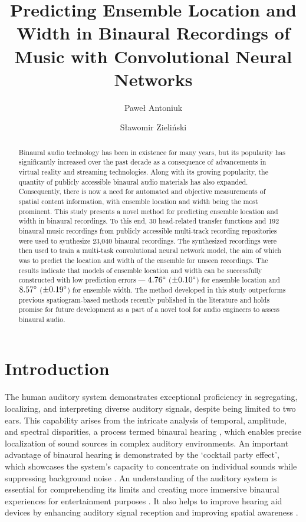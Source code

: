 \documentclass{article}
\title{Predicting Ensemble Location and Width in Binaural Recordings of Music with Convolutional Neural Networks}
\author[1,*]{Paweł Antoniuk}
\author[1]{Sławomir Zieliński}
\affil[1]{Faculty of Computer Science, Białystok University of Technology}
\affil[*]{Corresponding author: pawel.antoniuk@sd.pb.edu.pl}
\date{}
\begin{document}
\maketitle


\begin{abstract}
  Binaural audio technology has been in existence for many years, but its popularity has significantly increased over the past decade as a consequence of advancements in virtual reality and streaming technologies. Along with its growing popularity, the quantity of publicly accessible binaural audio materials has also expanded. Consequently, there is now a need for automated and objective measurements of spatial content information, with ensemble location and width being the most prominent. This study presents a novel method for predicting ensemble location and width in binaural recordings. To this end, 30 head-related transfer functions and 192 binaural music recordings from publicly accessible multi-track recording repositories were used to synthesize 23,040 binaural recordings. The synthesized recordings were then used to train a multi-task convolutional neural network model, the aim of which was to predict the location and width of the ensemble for unseen recordings. The results indicate that models of ensemble location and width can be successfully constructed with low prediction errors --- $4.76\degree$ ($\pm0.10\degree$) for ensemble location and $8.57\degree$ ($\pm0.19\degree$) for ensemble width. The method developed in this study outperforms previous spatiogram-based methods recently published in the literature and holds promise for future development as a part of a novel tool for audio engineers to assess binaural audio.
\end{abstract}

\section{Introduction}

The human auditory system demonstrates exceptional proficiency in segregating, localizing, and interpreting diverse auditory signals, despite being limited to two ears. This capability arises from the intricate analysis of temporal, amplitude, and spectral disparities, a process termed binaural hearing \cite{blauert_spatial_1996}, which enables precise localization of sound sources in complex auditory environments. An important advantage of binaural hearing is demonstrated by the `cocktail party effect', which showcases the system's capacity to concentrate on individual sounds while suppressing background noise \cite{cherry_experiments_1953}. An understanding of the auditory system is essential for comprehending its limits and creating more immersive binaural experiences for entertainment purposes \cite{zhang_surround_2017}. It also helps to improve hearing aid devices by enhancing auditory signal reception and improving spatial awareness \cite{hirsh_binaural_1950, thiemann_speech_2016}.
\end{document}
